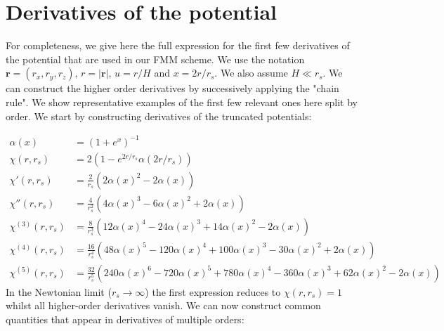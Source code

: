 \section{Derivatives of the potential}
\label{sec:pot_derivatives}

For completeness, we give here the full expression for the first few
derivatives of the potential that are used in our FMM scheme. We use
the notation $\mathbf{r}=(r_x, r_y, r_z)$, $r = |\mathbf{r}|$, $u=r/H$
and $x=2r/r_s$. We also assume $H \ll r_s$. We can construct the higher order derivatives by
successively applying the "chain rule". We show representative
examples of the first few relevant ones here split by order. We start
by constructing derivatives of the truncated potentials:

\begin{align}
  \alpha(x) &= \left(1 + e^x\right)^{-1}  \nonumber \\
  \chi(r, r_s) &= 2\left(1 - e^{2r/r_s}\alpha(2r/r_s) \right) \nonumber \\
  \chi'(r, r_s) &= \frac{2}{r_s}\left(2\alpha(x)^2 - 2\alpha(x)\right) \nonumber \\
  \chi''(r, r_s) &= \frac{4}{r_s^2}\left(4\alpha(x)^3 - 6\alpha(x)^2 + 2\alpha(x)\right) \nonumber \\
  \chi^{(3)}(r, r_s) &= \frac{8}{r_s^3} \left(12\alpha(x)^4 - 24\alpha(x)^3 + 14\alpha(x)^2 -2 \alpha(x)\right) \nonumber \\
  \chi^{(4)}(r, r_s) &= \frac{16}{r_s^4} \left(48\alpha(x)^5 - 120\alpha(x)^4 + 100\alpha(x)^3 -30 \alpha(x)^2 + 2\alpha(x)\right) \nonumber \\ 
  \chi^{(5)}(r, r_s) &= \frac{32}{r_s^5} \left(240\alpha(x)^6 - 720\alpha(x)^5 + 780\alpha(x)^4 - 360\alpha(x)^3 + 62\alpha(x)^2 - 2\alpha(x) \right) \nonumber
\end{align}
In the Newtonian limit ($r_s\rightarrow\infty$) the first expression
reduces to $\chi(r,r_s) = 1$ whilst all higher-order derivatives
vanish. We can now construct common quantities that appear in
derivatives of multiple orders:


